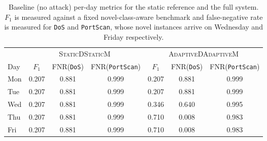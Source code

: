 \begin{table}
\caption{Baseline (no attack) per-day metrics for the static reference and the full system. $F_1$ is measured against a fixed novel-class-aware benchmark and false-negative rate is measured for \texttt{DoS} and \texttt{PortScan}, whose novel instances arrive on Wednesday and Friday respectively.}
\label{tab:baseline-adaptation}
\centering
\begin{tabular}{lcccccc}
\toprule
 & \multicolumn{3}{c}{\textsc{StaticDStaticM}} & \multicolumn{3}{c}{\textsc{AdaptiveDAdaptiveM}} \\
\cmidrule(lr){2-4}\cmidrule(lr){5-7}
Day & $F_1$ & FNR(\texttt{DoS}) & FNR(\texttt{PortScan}) & $F_1$ & FNR(\texttt{DoS}) & FNR(\texttt{PortScan}) \\
\midrule
Mon & 0.207 & 0.881 & 0.999 & 0.207 & 0.881 & 0.999 \\
Tue & 0.207 & 0.881 & 0.999 & 0.207 & 0.881 & 0.999 \\
Wed & 0.207 & 0.881 & 0.999 & 0.346 & 0.640 & 0.995 \\
Thu & 0.207 & 0.881 & 0.999 & 0.710 & 0.008 & 0.983 \\
Fri & 0.207 & 0.881 & 0.999 & 0.710 & 0.008 & 0.983 \\
\bottomrule
\end{tabular}
\end{table}
